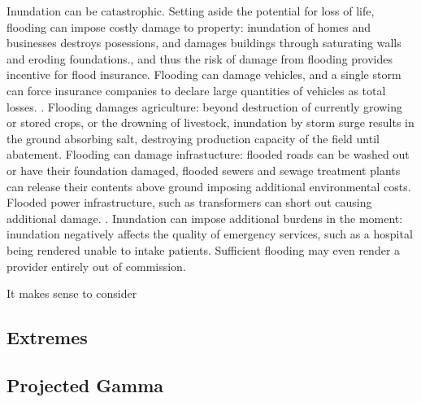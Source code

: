 Inundation can be catastrophic.  Setting aside the potential for loss of life, 
    flooding can impose costly damage to property: inundation of homes and 
    businesses destroys posessions, and damages buildings through saturating 
    walls and eroding foundations., and thus the risk of damage from flooding 
    provides incentive for flood insurance. \needcite  
    Flooding can damage vehicles, and a single storm can force insurance 
    companies to declare large quantities of vehicles as total losses. 
    \needcite.  Flooding damages agriculture: beyond 
    destruction of currently growing or stored crops, or the drowning of 
    livestock, inundation by storm surge results in the ground absorbing salt, 
    destroying production capacity of the field until abatement. Flooding can
    damage infrastucture: flooded roads can be washed out or have their 
    foundation damaged, flooded sewers and sewage treatment plants can release 
    their contents above ground imposing additional environmental costs.  
    Flooded power infrastructure, such as transformers can short out causing 
    additional damage. \citep{hutchings2021}.  Inundation can impose additional 
    burdens in the moment:  inundation negatively affects the quality of 
    emergency services, such as a hospital being rendered unable to intake 
    patients.  Sufficient flooding may even render a provider entirely out of 
    commission. 

It makes sense to consider

\subsection{Extremes}



\subsection{Projected Gamma}






